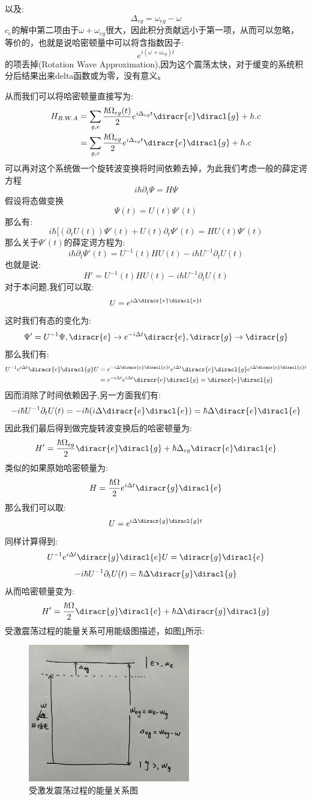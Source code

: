 以及:
\[\Delta_{eg}=\omega_{eg}-\omega\]
$c_e$的解中第二项由于$\omega+\omega_{eg}$很大，因此积分贡献远小于第一项，从而可以忽略，等价的，也就是说哈密顿量中可以将含指数因子:
\[e^{i(\omega+\omega_{eg})t}\]
的项丢掉(Rotation Wave Approximation),因为这个震荡太快，对于缓变的系统积分后结果出来delta函数或为零，没有意义。\par
从而我们可以将哈密顿量直接写为:
\begin{align}
H_{R.W.A}&=\sum_{g,e}\frac{\hbar\Omega_{eg}(t)}{2}e^{i\Delta_{eg}t}\diracr{e}\diracl{g}+h.c\\
\notag &=\sum_{g,e}\frac{\hbar\Omega_{eg}}{2}e^{i\Delta_{eg}t}\diracr{e}\diracl{g}+h.c
\end{align}
可以再对这个系统做一个旋转波变换将时间依赖去掉，为此我们考虑一般的薛定谔方程
\[i\hbar \partial_t \Psi=H\Psi\]
假设将态做变换
\[\Psi(t)=U(t)\Psi'(t)\]
那么有:
\[i\hbar[(\partial_t U(t))\Psi'(t)+U(t)\partial_t \Psi'(t)=HU(t)\Psi'(t)\]
那么关于$\Psi'(t)$的薛定谔方程为:
\[i\hbar\partial_t\Psi'(t)=U^{-1}(t)HU(t)-i\hbar U^{-1}\partial_t U(t)\]
也就是说:
\[H'=U^{-1}(t)HU(t)-i\hbar U^{-1}\partial_t U(t)\]
对于本问题,我们可以取:
\[U=e^{i\Delta\diracr{e}\diracl{e}t}\]
这时我们有态的变化为:
\[\Psi'=U^{-1}\Psi,\diracr{e}\rightarrow e^{-i\Delta t}\diracr{e},\diracr{g}\rightarrow \diracr{g}\]
那么我们有:
\begin{align*}
U^{-1}e^{i\Delta t}\diracr{e}\diracl{g}U&=e^{-i\Delta\diracr{e}\diracl{e}t}e^{i\Delta t}\diracr{e}\diracl{g}e^{i\Delta\diracr{e}\diracl{e}t}\\
&=e^{-i\Delta t}e^{i\Delta t}\diracr{e}\diracl{g}
=\diracr{e}\diracl{g}
\end{align*}
因而消除了时间依赖因子,另一方面我们有:
\[-i\hbar U^{-1}\partial_t U(t)=-i\hbar(i\Delta \diracr{e}\diracl{e})=\hbar\Delta \diracr{e}\diracl{e}\]
因此我们最后得到做完旋转波变换后的哈密顿量为:
\[H'=\frac{\hbar\Omega_{eg}}{2}\diracr{e}\diracl{g}+\hbar\Delta_{eg} \diracr{e}\diracl{e}\]
类似的如果原始哈密顿量为:
\[H=\frac{\hbar\Omega}{2}e^{i\Delta t}\diracr{g}\diracl{e}\]
那么我们可以取:
\[U=e^{i\Delta\diracr{g}\diracl{g}t}\]
同样计算得到:
\[U^{-1}e^{i\Delta t}\diracr{g}\diracl{e}U=\diracr{g}\diracl{e}\]
\[-i\hbar U^{-1}\partial_t U(t)=\hbar\Delta \diracr{g}\diracl{g}\]
从而哈密顿量变为:
\[H'=\frac{\hbar\Omega}{2}\diracr{g}\diracl{e}+\hbar\Delta \diracr{g}\diracl{g}\]
受激震荡过程的能量关系可用能级图描述，如图\ref{fig:shouji}所示:
\begin{figure}
\begin{center}
\includegraphics[height=6cm]{./figures/shouji.jpg}
\caption{受激发震荡过程的能量关系图}
\label{fig:shouji}
\end{center}
\end{figure}
